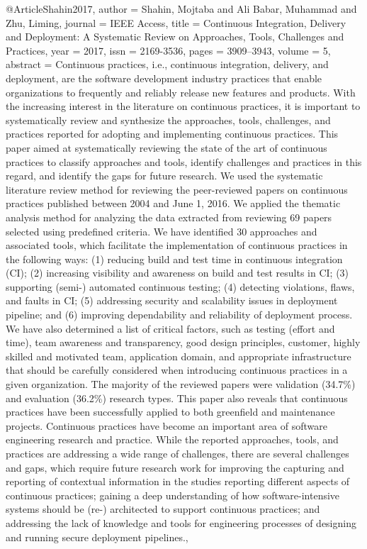 {{{{{{{{@Article{Shahin2017,
  author     = {Shahin, Mojtaba and Ali Babar, Muhammad and Zhu, Liming},
  journal    = {IEEE Access},
  title      = {Continuous {Integration}, {Delivery} and {Deployment}: {A} {Systematic} {Review} on {Approaches}, {Tools}, {Challenges} and {Practices}},
  year       = {2017},
  issn       = {2169-3536},
  pages      = {3909--3943},
  volume     = {5},
  abstract   = {Continuous practices, i.e., continuous integration, delivery, and deployment, are the software development industry practices that enable organizations to frequently and reliably release new features and products. With the increasing interest in the literature on continuous practices, it is important to systematically review and synthesize the approaches, tools, challenges, and practices reported for adopting and implementing continuous practices. This paper aimed at systematically reviewing the state of the art of continuous practices to classify approaches and tools, identify challenges and practices in this regard, and identify the gaps for future research. We used the systematic literature review method for reviewing the peer-reviewed papers on continuous practices published between 2004 and June 1, 2016. We applied the thematic analysis method for analyzing the data extracted from reviewing 69 papers selected using predefined criteria. We have identified 30 approaches and associated tools, which facilitate the implementation of continuous practices in the following ways: (1) reducing build and test time in continuous integration (CI); (2) increasing visibility and awareness on build and test results in CI; (3) supporting (semi-) automated continuous testing; (4) detecting violations, flaws, and faults in CI; (5) addressing security and scalability issues in deployment pipeline; and (6) improving dependability and reliability of deployment process. We have also determined a list of critical factors, such as testing (effort and time), team awareness and transparency, good design principles, customer, highly skilled and motivated team, application domain, and appropriate infrastructure that should be carefully considered when introducing continuous practices in a given organization. The majority of the reviewed papers were validation (34.7\%) and evaluation (36.2\%) research types. This paper also reveals that continuous practices have been successfully applied to both greenfield and maintenance projects. Continuous practices have become an important area of software engineering research and practice. While the reported approaches, tools, and practices are addressing a wide range of challenges, there are several challenges and gaps, which require future research work for improving the capturing and reporting of contextual information in the studies reporting different aspects of continuous practices; gaining a deep understanding of how software-intensive systems should be (re-) architected to support continuous practices; and addressing the lack of knowledge and tools for engineering processes of designing and running secure deployment pipelines.},
}}}}}}}}}
